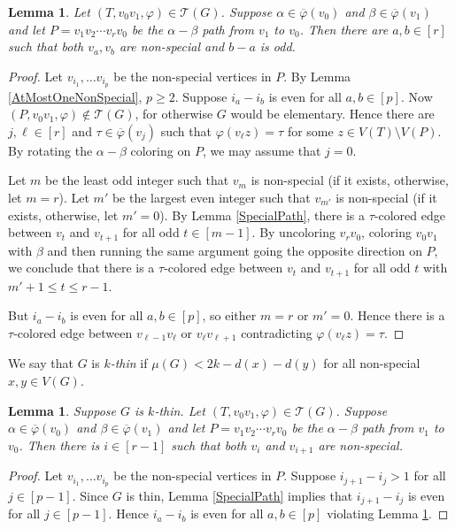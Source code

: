 \documentclass[12pt]{amsart}
\theoremstyle{plain}
\newtheorem{lem}[thm]{Lemma}
\theoremstyle{definition}
\theoremstyle{remark}
\newcommand{\fancy}[1]{\mathcal{#1}}
\newcommand{\T}{\fancy{T}}
\newcommand{\irange}[1]{\left[#1\right]}
\newcommand{\vph}{\varphi}
\newcommand{\vphn}{\overline{\varphi}}
\begin{document}
\begin{lem}\label{HelperThree}
Let $(T, v_0v_1, \vph) \in \T(G)$. Suppose $\alpha \in \vphn(v_0)$ and $\beta \in \vphn(v_1)$ and let $P = v_1v_2\cdots v_rv_0$ be the $\alpha-\beta$ path from $v_1$ to $v_0$.  Then there
are $a,b \in \irange{r}$ such that both $v_a, v_b$ are non-special and $b - a$ is odd.
\end{lem}
\begin{proof}
Let $v_{i_1}, \ldots v_{i_p}$ be the non-special vertices in $P$. By Lemma \ref{AtMostOneNonSpecial}, $p \ge 2$.  Suppose $i_a - i_b$ is even for all $a,b \in \irange{p}$.  
Now $(P, v_0v_1, \vph) \not \in \T(G)$, for otherwise $G$ would be elementary.  Hence there are $j,\ell \in \irange{r}$ and $\tau \in \vphn(v_j)$ such that $\vph(v_\ell z) = \tau$ for some $z \in V(T) \setminus V(P)$.
By rotating the $\alpha-\beta$ coloring on $P$, we may assume that $j=0$.

Let $m$ be the least odd integer such that $v_m$ is non-special (if it exists, otherwise, let $m=r$).
Let $m'$ be the largest even integer such that $v_{m'}$ is non-special (if it exists, otherwise, let $m'=0$).
By Lemma \ref{SpecialPath}, there is a $\tau$-colored edge between $v_t$ and $v_{t+1}$ for all odd $t \in \irange{m-1}$.
By uncoloring $v_rv_0$, coloring $v_0v_1$ with $\beta$ and then running the same argument going the opposite direction on $P$, we conclude that 
there is a $\tau$-colored edge between $v_t$ and $v_{t+1}$ for all odd $t$ with $m' + 1 \le t \le r-1$.

But $i_a - i_b$ is even for all $a,b \in \irange{p}$, so either $m=r$ or $m'=0$.  Hence there is a $\tau$-colored edge between $v_{\ell-1} v_{\ell}$ or $v_{\ell} v_{\ell + 1}$ contradicting $\vph(v_\ell z) = \tau$.
\end{proof}

We say that $G$ is \emph{$k$-thin} if $\mu(G) < 2k - d(x) - d(y)$ for all non-special $x,y \in V(G)$.
\begin{lem}\label{HelperFour}
Suppose $G$ is $k$-thin. Let $(T, v_0v_1, \vph) \in \T(G)$. Suppose $\alpha \in \vphn(v_0)$ and $\beta \in \vphn(v_1)$ and let $P = v_1v_2\cdots v_rv_0$ be the $\alpha-\beta$ path from $v_1$ to $v_0$.  Then there
is $i \in \irange{r-1}$ such that both $v_i$ and $v_{i+1}$ are non-special.
\end{lem}
\begin{proof}
Let $v_{i_1}, \ldots v_{i_p}$ be the non-special vertices in $P$.
Suppose $i_{j+1} - i_j > 1$ for all $j \in \irange{p-1}$. Since $G$ is thin, Lemma \ref{SpecialPath} implies that $i_{j+1} - i_j$ is even for all $j \in \irange{p-1}$.  
Hence $i_a - i_b$ is even for all $a,b \in \irange{p}$ violating Lemma \ref{HelperThree}.
\end{proof}
\end{document}

